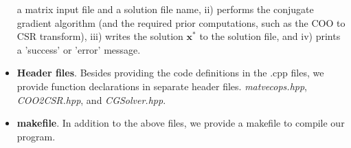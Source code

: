 \documentclass[12pt, a4paper]{article}
\begin{document}
\begin{itemize}
    a matrix input file and a solution file name, ii) performs the conjugate 
    gradient algorithm (and the required prior computations, such as the COO 
    to CSR transform), iii) writes the solution $\mathbf{x}^*$ to 
    the solution file, and iv) prints a 'success' or 'error' message.
    \item \textbf{Header files}. Besides providing the code definitions in 
    the .cpp files, we provide function declarations in separate header files. 
    \textit{matvecops.hpp}, \textit{COO2CSR.hpp}, and \textit{CGSolver.hpp}.
    \item \textbf{makefile}. In addition to the above files, we provide a 
    makefile to compile our program.
\end{itemize}
\end{document}
